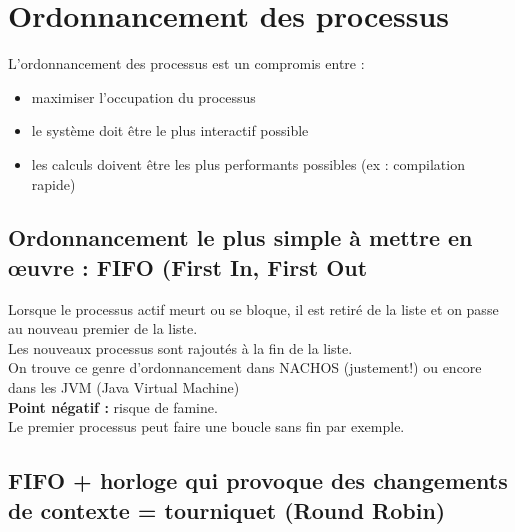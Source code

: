 \documentclass[12pt,a4paper]{report}
\begin{document}
\section{Ordonnancement des processus}
L'ordonnancement des processus est un compromis entre : 
\begin{itemize}
\item maximiser l'occupation du processus
\item le système doit être le plus interactif possible
\item les calculs doivent être les plus performants possibles (ex : compilation rapide)
\end{itemize}

\medskip

\subsection{Ordonnancement le plus simple à mettre en œuvre : FIFO (First In, First Out}
\medskip
\begin{center}
\end{center}
\medskip

Lorsque le processus actif meurt ou se bloque, il est retiré de la liste et on passe au nouveau premier de la liste.\\
Les nouveaux processus sont rajoutés à la fin de la liste.\\
On trouve ce genre d'ordonnancement dans NACHOS (justement!) ou encore dans les JVM (Java Virtual Machine)\\

\textbf{Point négatif : } risque de famine.\\
Le premier processus peut faire une boucle sans fin par exemple.

\subsection{FIFO + horloge qui provoque des changements de contexte = tourniquet (Round Robin)}
\end{document}
